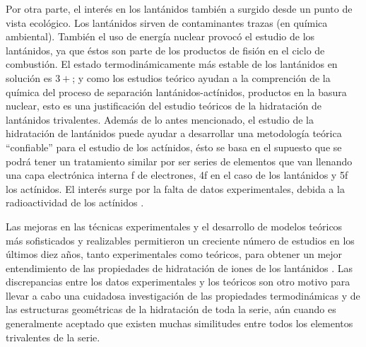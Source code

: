 Por otra parte, el inter\'es en los lant\'anidos tambi\'en a surgido
desde un punto de vista ecol\'ogico. Los lant\'anidos sirven de 
contaminantes trazas (en qu\'imica ambiental). Tambi\'en el uso de
energ\'ia nuclear provoc\'o el estudio de los lant\'anidos, ya que 
\'estos son parte de los productos de fisi\'on en el ciclo de 
combusti\'on. 
El estado termodin\'amicamente m\'as estable de los
lant\'anidos en soluci\'on es $3+$;  y como los estudios 
te\'orico ayudan a la comprenci\'on de la qu\'imica del proceso de 
separaci\'on lant\'anidos-act\'inidos, productos en la basura 
nuclear, esto es una justificaci\'on del estudio te\'oricos de la 
hidrataci\'on de lant\'anidos trivalentes. 
Adem\'as de lo antes mencionado, el estudio de la 
hidrataci\'on de lant\'anidos puede ayudar a desarrollar una 
metodolog\'ia te\'orica ``confiable'' para el estudio de los 
act\'inidos, \'esto se basa en el supuesto que se podr\'a tener un
tratamiento similar por ser series de elementos que van llenando una 
capa electr\'onica interna f de electrones, 4f en el caso de los 
lant\'anidos y 5f los act\'inidos. El inter\'es surge por la falta de
datos experimentales, debida a la radioactividad de los act\'inidos
\citep{Ciup2010,Kuta2010,Bunz2006}.


Las mejoras en las t\'ecnicas experimentales y el desarrollo de 
modelos te\'oricos m\'as sofisticados y realizables permitieron un 
creciente n\'umero de estudios en los \'ultimos diez a\~nos, tanto 
experimentales como te\'oricos, para obtener un mejor entendimiento 
de las propiedades de hidrataci\'on de iones de los lant\'anidos 
\citep{Dang2012}. Las discrepancias entre los datos experimentales
y los te\'oricos son otro motivo para llevar a cabo una cuidadosa 
investigaci\'on de las propiedades termodin\'amicas y de las 
estructuras geom\'etricas de la hidrataci\'on de toda la serie, a\'un 
cuando es generalmente aceptado que existen muchas similitudes entre
todos los elementos trivalentes de la serie.

